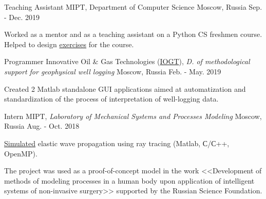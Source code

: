 \begin{cventries}

  \cventry
    {Teaching Assistant} %
    {MIPT, \hspace{5pt} Department of Computer Science} %
    {Moscow, Russia} %
    {Sep. - Dec. 2019} %
    {
      \begin{cvitems} %
        \item {Worked as a mentor and as a teaching assistant on a Python CS freshmen course. Helped to design \href{http://cs.mipt.ru/python}{exercises} for the course.}
      \end{cvitems}
    }
    

  \cventry
    {Programmer} %
    {Innovative Oil \& Gas Technologies (\href{http://www.iogt.ru/eng/}{IOGT}), \textit{D. of methodological support for geophysical well logging}} %
    {Moscow, Russia} %
    {Feb. - May. 2019} %
    {
      \begin{cvitems} %
        \item {Created 2 Matlab standalone GUI applications aimed at automatization and standardization of the process of interpretation of well-logging data.}
      \end{cvitems}
    }


  \cventry
    {Intern} %
    {MIPT, \hspace{5pt} \textit{Laboratory of Mechanical Systems and Processes Modeling}} %
    {Moscow, Russia} %
    {Aug. - Oct. 2018} %
    {
      \begin{cvitems} %
        \item {\href{https://github.com/PolyachenkoYA/geo}{Simulated} elastic wave propagation using ray tracing (Matlab, С/С++, OpenMP).}
        \item {The project was used as a proof-of-concept model in the work <<Development of methods of modeling processes in a human body upon application of intelligent systems of non-invasive surgery>> supported by the Russian Science Foundation.}
      \end{cvitems}
    }

\end{cventries}
